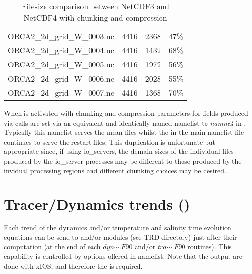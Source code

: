 \documentclass[../main/NEMO_manual]{subfiles}
\begin{document}
\begin{table}
\begin{tabular}{lrrr}
    ORCA2\_2d\_grid\_W\_0003.nc & 4416		& 2368	  & 47\%      \\
    ORCA2\_2d\_grid\_W\_0004.nc & 4416		& 1432	  & 68\%      \\
    ORCA2\_2d\_grid\_W\_0005.nc & 4416		& 1972	  & 56\%      \\
    ORCA2\_2d\_grid\_W\_0006.nc & 4416		& 2028	  & 55\%      \\
    ORCA2\_2d\_grid\_W\_0007.nc & 4416		& 1368	  & 70\%      \\
  \end{tabular}
  \caption{
    \protect\label{tab:NC4}
    Filesize comparison between NetCDF3 and NetCDF4 with chunking and compression
  }
\end{table}

When  is activated with  chunking and compression parameters for fields produced via
 calls are set via an equivalent and identically named namelist to \textit{namnc4} in
.
Typically this namelist serves the mean files whilst the  in the main namelist file continues to
serve the restart files.
This duplication is unfortunate but appropriate since, if using io\_servers, the domain sizes of
the individual files produced by the io\_server processes may be different to those produced by
the invidual processing regions and different chunking choices may be desired.
 
\section{Tracer/Dynamics trends  (\protect{})}
\label{sec:DIA_trd}



Each trend of the dynamics and/or temperature and salinity time evolution equations can be send to
 and/or  modules (see TRD directory) just after their computation
(\ie at the end of each $dyn\cdots.F90$ and/or $tra\cdots.F90$ routines).
This capability is controlled by options offered in  namelist.
Note that the output are done with xIOS, and therefore the  is required.
\end{document}
